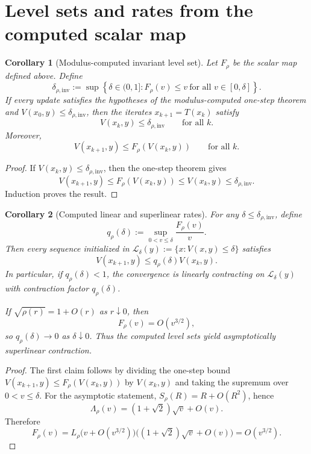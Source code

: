 \documentclass[11pt]{article}
\newtheorem{corollary}{Corollary}
\begin{document}
\section{Level sets and rates from the computed scalar map}

\begin{corollary}[Modulus-computed invariant level set]
Let $F_\rho$ be the scalar map defined above.  Define
\[
    \delta_{\rho,\mathrm{inv}}
    :=
    \sup\left\{
        \delta\in(0,1]:
        F_\rho(v)\le v
        \ \text{for all }v\in[0,\delta]
    \right\}.
\]
If every update satisfies the hypotheses of the modulus-computed one-step theorem and
$V(x_0,y)\le\delta_{\rho,\mathrm{inv}}$, then the iterates $x_{k+1}=T(x_k)$ satisfy
\[
    V(x_k,y)\le\delta_{\rho,\mathrm{inv}}
    \qquad\text{for all }k.
\]
Moreover,
\[
    V(x_{k+1},y)
    \le
    F_\rho(V(x_k,y))
    \qquad\text{for all }k.
\]
\end{corollary}

\begin{proof}
If $V(x_k,y)\le\delta_{\rho,\mathrm{inv}}$, then the one-step theorem gives
\[
    V(x_{k+1},y)
    \le
    F_\rho(V(x_k,y))
    \le
    V(x_k,y)
    \le
    \delta_{\rho,\mathrm{inv}}.
\]
Induction proves the result.
\end{proof}

\begin{corollary}[Computed linear and superlinear rates]
For any $\delta\le\delta_{\rho,\mathrm{inv}}$, define
\[
    q_\rho(\delta)
    :=
    \sup_{0<v\le\delta}\frac{F_\rho(v)}{v}.
\]
Then every sequence initialized in $\mathcal L_\delta(y):=\{x:V(x,y)\le\delta\}$ satisfies
\[
    V(x_{k+1},y)
    \le
    q_\rho(\delta)V(x_k,y).
\]
In particular, if $q_\rho(\delta)<1$, the convergence is linearly contracting on
$\mathcal L_\delta(y)$ with contraction factor $q_\rho(\delta)$.

If $\sqrt{\rho(r)}=1+O(r)$ as $r\downarrow0$, then
\[
    F_\rho(v)=O(v^{3/2}),
\]
so $q_\rho(\delta)\to0$ as $\delta\downarrow0$.  Thus the computed level sets yield
asymptotically superlinear contraction.
\end{corollary}

\begin{proof}
The first claim follows by dividing the one-step bound
$V(x_{k+1},y)\le F_\rho(V(x_k,y))$ by $V(x_k,y)$ and taking the supremum over
$0<v\le\delta$.
For the asymptotic statement, $S_\rho(R)=R+O(R^2)$, hence
\[
    \Lambda_\rho(v)=(1+\sqrt2)\sqrt v+O(v).
\]
Therefore
\[
    F_\rho(v)
    =
    L_\rho\bigl(v+O(v^{3/2})\bigr)\bigl((1+\sqrt2)\sqrt v+O(v)\bigr)
    =
    O(v^{3/2}).
\]
\end{proof}
\end{document}
